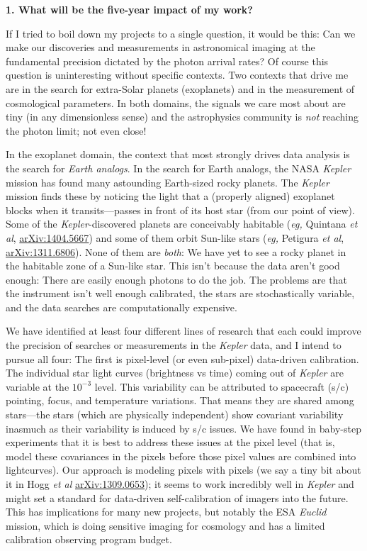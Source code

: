 \documentclass[11pt, letterpaper]{article}
\newcommand{\arxiv}[1]{\href{http://arxiv.org/abs/#1}{arXiv:#1}}
\begin{document}
\sloppy\sloppypar

\noindent\textbf{1. What will be the five-year impact of my work?}
\smallskip

If I tried to boil down my projects to a single question, it would be
this:
Can we make our discoveries and measurements in astronomical imaging
at the fundamental precision dictated by the photon arrival rates?
Of course this question is uninteresting without specific contexts.
Two contexts that drive me are in the search for extra-Solar planets
(exoplanets) and in the measurement of cosmological parameters.
In both domains, the signals we care most about are tiny (in any
dimensionless sense) and the astrophysics community is \emph{not}
reaching the photon limit; not even close!

In the exoplanet domain, the context that most strongly drives data
analysis is the search for \emph{Earth analogs}.
In the search for Earth analogs, the NASA \textsl{Kepler} mission has
found many astounding Earth-sized rocky planets.
The \textsl{Kepler} mission finds these by noticing the light that a
(properly aligned) exoplanet blocks when it transits---passes in front
of its host star (from our point of view).
Some of the \textsl{Kepler}-discovered planets are conceivably habitable
(\textit{eg,} Quintana \textit{et al}, \arxiv{1404.5667})
and some of them orbit Sun-like stars
(\textit{eg,} Petigura \textit{et al}, \arxiv{1311.6806}).
None of them are \emph{both}: We have yet to see a rocky planet in the
habitable zone of a Sun-like star.
This isn't because the data aren't good enough:
There are easily enough photons to do the job.
The problems are that the instrument isn't well enough calibrated, the
stars are stochastically variable, and the data searches are
computationally expensive.

We have identified at least four different lines of research that each
could improve the precision of searches or measurements in the
\textsl{Kepler} data, and I intend to pursue all four:
The first is pixel-level (or even sub-pixel) data-driven calibration.
The individual star light curves (brightness vs time) coming out of
\textsl{Kepler} are variable at the $10^{-3}$ level.
This variability can be attributed to spacecraft (s/c) pointing,
focus, and temperature variations.
That means they are shared among stars---the stars (which are
physically independent) show covariant variability inasmuch as their
variability is induced by s/c issues.
We have found in baby-step experiments that it is best to address
these issues at the pixel level (that is, model these covariances in
the pixels before those pixel values are combined into lightcurves).
Our approach is modeling pixels with pixels
(we say a tiny bit about it in Hogg \textit{et al} \arxiv{1309.0653});
it seems to work
incredibly well in \textsl{Kepler} and might set a standard for
data-driven self-calibration of imagers into the future.
This has implications for many new projects, but notably the ESA
\textsl{Euclid} mission, which is doing sensitive imaging for
cosmology and has a limited calibration observing program budget.
\end{document}
